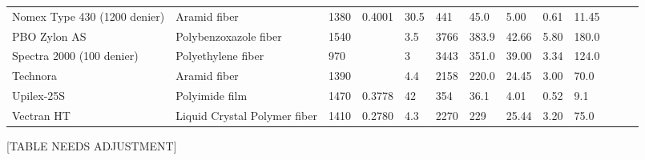 \begin{table}[h]
\begin{tabular}{lllllllllllll}
Nomex Type 430 (1200 denier) & Aramid fiber                      & 1380                                          & 0.4001                                              & 30.5                                  & 441                                       & 45.0                                & 5.00                                      & 0.61                                & 11.45                              &                                  &               &  \\
PBO Zylon AS                 & Polybenzoxazole fiber             & 1540                                          &                                                     & 3.5                                   & 3766                                      & 383.9                               & 42.66                                     & 5.80                                & 180.0                              &                                  &               &  \\
Spectra 2000 (100 denier)    & Polyethylene fiber                & 970                                           &                                                     & 3                                     & 3443                                      & 351.0                               & 39.00                                     & 3.34                                & 124.0                              &                                  &               &  \\
Technora                     & Aramid fiber                      & 1390                                          &                                                     & 4.4                                   & 2158                                      & 220.0                               & 24.45                                     & 3.00                                & 70.0                               &                                  &               &  \\
Upilex-25S                   & Polyimide film                    & 1470                                          & 0.3778                                              & 42                                    & 354                                       & 36.1                                & 4.01                                      & 0.52                                & 9.1                                &                                  &               &  \\
Vectran HT                   & Liquid Crystal Polymer fiber      & 1410                                          & 0.2780                                              & 4.3                                   & 2270                                      & 229                                 & 25.44                                     & 3.20                                & 75.0                               &                                  &               & 
\end{tabular}
\label{table:strucmatoverview}
\end{table}

[TABLE NEEDS ADJUSTMENT]

